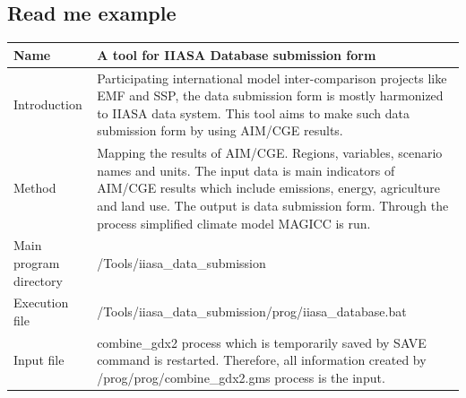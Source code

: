 \documentclass[10pt,a4paper,titlepage,dvipdfmx]{book}
\begin{document}
\subsection{\label{subsec:ReaMeExa}Read me example}


\begin{tabularx}{\textwidth}{|
p{}|
p{}|} 
\caption{\label{tab:ReaExaIAMC}readme example for IAMC database template} \\
\hline 
Name & A tool for IIASA Database submission form  \\\hline 
Introduction & Participating international model inter-comparison projects like EMF and SSP, the data submission form is mostly harmonized to IIASA data system. This tool aims to make such data submission form by using AIM/CGE results. \\\hline 
Method & Mapping the results of AIM/CGE. Regions, variables, scenario names and units. The input data is main indicators of AIM/CGE results which include emissions, energy, agriculture and land use. The output is data submission form. Through the process simplified climate model MAGICC is run. \\\hline 
Main program directory & /Tools/iiasa\_data\_submission \\\hline 
Execution file & /Tools/iiasa\_data\_submission/prog/iiasa\_database.bat \\\hline 
Input file & combine\_gdx2 process which is temporarily saved by SAVE command is restarted. Therefore, all information created by /prog/prog/combine\_gdx2.gms process is the input. \\\hline 
\end{tabularx}
\end{document}
